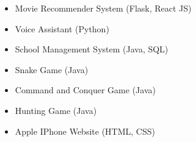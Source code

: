 \documentclass[10pt,a4paper,ragged2e,withhyper]{altacv}
\let\olditem\item
\renewcommand{\item}{\small\olditem}
\begin{document}
\begin{paracol}{2}


\begin{itemize}
\item Movie Recommender System \scriptsize(Flask, React JS)
\item Voice Assistant \scriptsize(Python)
\item School Management System \scriptsize(Java, SQL)
\item Snake Game \scriptsize(Java)
\item Command and Conquer Game \scriptsize(Java)
\item Hunting Game \scriptsize(Java)
\item Apple IPhone Website \scriptsize(HTML, CSS)
\end{itemize}



\end{paracol}
\end{document}
